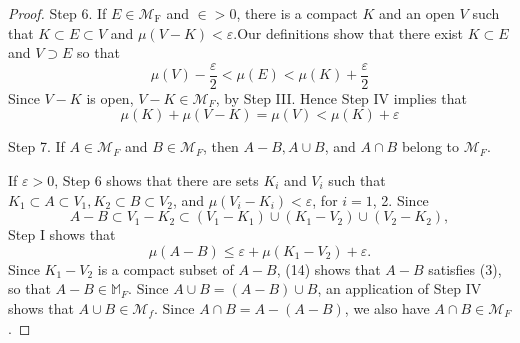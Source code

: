 \documentclass[12pt, a4paper, oneside]{book}
\begin{document}
\begin{theorem}
\begin{proof}
        Step 6. If $E \in \mathcal{M}_{\mathrm{F}}$ and $\in>0$, there is a compact $K$ and an open $V$ such that $K \subset E \subset V$ and $\mu(V-K)<\varepsilon$.Our definitions show that there exist $K \subset E$ and $V \supset E$ so that
        \begin{equation*}
            \mu(V)-\frac{\varepsilon}{2}<\mu(E)<\mu(K)+\frac{\varepsilon}{2}
        \end{equation*}
        Since $V-K$ is open, $V-K \in \mathcal{M}_F$, by Step III. Hence Step IV implies that
        \begin{equation*}
            \mu(K)+\mu(V-K)=\mu(V)<\mu(K)+\varepsilon
        \end{equation*}

        Step 7.
        If $A \in \mathcal{M}_F$ and $B \in \mathcal{M}_F$, then $A-  B, A \cup B$, and $A \cap B$ belong to $\mathcal{M}_F$.

        If $\varepsilon>0$, Step 6 shows that there are sets $K_i$ and $V_i$ such that $K_1 \subset A \subset V_1, K_2 \subset B \subset V_2$, and $\mu\left(V_i-K_i\right)<\varepsilon$, for $i=1$, 2. Since
        \begin{equation*}
            A-B \subset V_1-K_2 \subset\left(V_1-K_1\right) \cup\left(K_1-V_2\right) \cup\left(V_2-K_2\right),
        \end{equation*}
        Step I shows that
        \begin{equation*}
            \mu(A-B) \leq \varepsilon+\mu\left(K_1-V_2\right)+\varepsilon .
        \end{equation*}
        Since $K_1-V_2$ is a compact subset of $A-B$, (14) shows that $A-B$ satisfies (3), so that $A-B \in \mathbb{M}_F$.
        Since $A \cup B=(A-B) \cup B$, an application of Step IV shows that $A \cup B \in \mathcal{M}_f$. Since $A \cap B=A-(A-B)$, we also have $A \cap B \in \mathcal{M}_F$.
    \end{proof}
\end{theorem}
\end{document}
